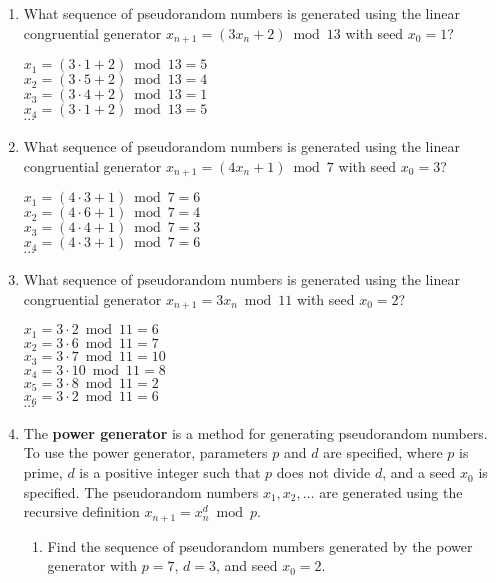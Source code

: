 \documentclass[11pt]{article}
\begin{document}
\begin{enumerate}[label=\textbf{\arabic*.}]
	\item What sequence of pseudorandom numbers is generated using the linear congruential generator $x_{n + 1} = (3x_n + 2) \bmod 13$ with seed $x_0 = 1$?
	
	$x_1 = (3 \cdot 1 + 2) \bmod 13 = 5$ \\
	$x_2 = (3 \cdot 5 + 2) \bmod 13 = 4$ \\
	$x_3 = (3 \cdot 4 + 2) \bmod 13 = 1$ \\
	$x_4 = (3 \cdot 1 + 2) \bmod 13 = 5$ \\
	$\cdots$
	
	\item What sequence of pseudorandom numbers is generated using the linear congruential generator $x_{n + 1} = (4x_n + 1) \bmod 7$ with seed $x_0 = 3$?
	
	$x_1 = (4 \cdot 3 + 1) \bmod 7 = 6$ \\
	$x_2 = (4 \cdot 6 + 1) \bmod 7 = 4$ \\
	$x_3 = (4 \cdot 4 + 1) \bmod 7 = 3$ \\
	$x_4 = (4 \cdot 3 + 1) \bmod 7 = 6$ \\
	$\cdots$
	
	\item What sequence of pseudorandom numbers is generated using the linear congruential generator $x_{n + 1} = 3x_n \bmod 11$ with seed $x_0 = 2$?
	
	$x_1 = 3 \cdot  2 \bmod 11 = 6$ \\
	$x_2 = 3 \cdot 6 \bmod 11 = 7$ \\
	$x_3 = 3 \cdot 7 \bmod 11 = 10$ \\
	$x_4 = 3 \cdot 10 \bmod 11 = 8$ \\
	$x_5 = 3 \cdot 8 \bmod 11 = 2$ \\
	$x_6 = 3 \cdot 2 \bmod 11 = 6$ \\
	$\cdots$
	
	\item The \textbf{power generator} is a method for generating pseudorandom numbers. To use the power generator, parameters $p$ and $d$ are specified, where $p$ is prime, $d$ is a positive integer such that $p$ does not divide $d$, and a seed $x_0$ is specified. The pseudorandom numbers $x_1, x_2, \ldots$ are generated using the recursive definition $x_{n + 1} = x_n^d \bmod p$.
	
	\begin{enumerate}[label=\textbf{\alph*)}]
		\item Find the sequence of pseudorandom numbers generated by the power generator with $p = 7$, $d = 3$, and seed $x_0 = 2$.
		

\end{enumerate}
\end{enumerate}
\end{document}
